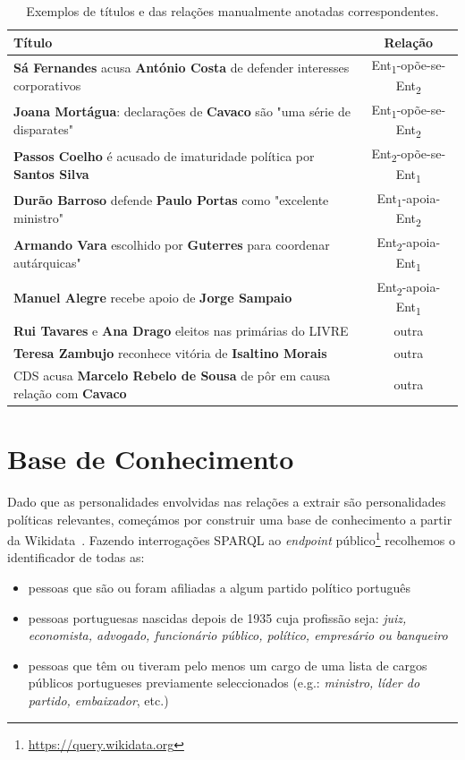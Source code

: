 \documentclass[a4paper, twocolumn, 11pt, twoside]{article}
\begin{document}
\begin{table}[!h]
  \centering
  \begin{tabular}{lc}
      {\bf Título} & {\bf Relação} \\
      \hline
	  \textbf{Sá Fernandes} acusa \textbf{António Costa} de defender interesses corporativos &	Ent\textsubscript{1}-opõe-se-Ent\textsubscript{2} \\
	  \textbf{Joana Mortágua}: declarações de \textbf{Cavaco} são "uma série de disparates" & Ent\textsubscript{1}-opõe-se-Ent\textsubscript{2} \\
	  \textbf{Passos Coelho} é acusado de imaturidade política por \textbf{Santos Silva} &	Ent\textsubscript{2}-opõe-se-Ent\textsubscript{1}	\\
	  \textbf{Durão Barroso} defende \textbf{Paulo Portas} como "excelente ministro" & Ent\textsubscript{1}-apoia-Ent\textsubscript{2}	\\
	  \textbf{Armando Vara} escolhido por \textbf{Guterres} para coordenar autárquicas" & Ent\textsubscript{2}-apoia-Ent\textsubscript{1}	\\
	  \textbf{Manuel Alegre} recebe apoio de \textbf{Jorge Sampaio} & Ent\textsubscript{2}-apoia-Ent\textsubscript{1}	\\
	  \textbf{Rui Tavares} e \textbf{Ana Drago} eleitos nas primárias do LIVRE & outra	\\
	  \textbf{Teresa Zambujo} reconhece vitória de \textbf{Isaltino Morais} & outra	\\
	  CDS acusa \textbf{Marcelo Rebelo de Sousa} de pôr em causa relação com \textbf{Cavaco} & outra \\
	  \hline
  \end{tabular}
  \caption{Exemplos de títulos e das relações manualmente anotadas correspondentes.}
  \label{tab:samples}
\end{table}

\section{Base de Conhecimento}
\label{sec_kb}
Dado que as personalidades envolvidas nas relações a extrair são personalidades políticas relevantes, começámos por construir uma base de conhecimento a partir da Wikidata~\citep{MKGGB2018}. Fazendo interrogações SPARQL ao \textit{endpoint} público\footnote{\url{https://query.wikidata.org}} recolhemos o identificador de todas as:

\begin{itemize}  
\item pessoas que são ou foram afiliadas a algum partido político português
\item pessoas portuguesas nascidas depois de 1935 cuja profissão seja: \textit{juiz, economista, advogado, funcionário público, político, empresário ou banqueiro}
\item pessoas que têm ou tiveram pelo menos um cargo de uma lista de cargos públicos portugueses previamente seleccionados (e.g.: \textit{ministro, líder do partido, embaixador}, etc.)
\end{itemize}  
\end{document}

